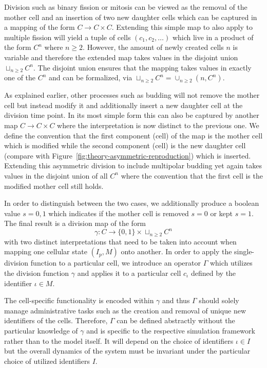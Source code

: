 Division such as binary fission or mitosis can be viewed as the removal of the mother
cell and an insertion of two new daughter cells which can be captured in a mapping of the form
$C\rightarrow C\times C$.
Extending this simple map to also apply to multiple fission will yield a tuple of cells
$(c_1,c_2,\dots)$ which live in a product of the form $C^n$ where $n\geq 2$.
However, the amount of newly created cells $n$ is variable and therefore the extended map takes
values in the disjoint union $\sqcup_{n\geq 2}C^n$.
The disjoint union ensures that the mapping takes values in exactly one of the $C^n$ and can be
formalized, via $\sqcup_{n\geq 2}C^n = \cup_{n\geq 2}(n,C^n)$.

As explained earlier, other processes such as budding will not remove the mother cell but instead
modify it and additionally insert a new daughter cell at the division time point.
In its most simple form this can also be captured by another map $C\rightarrow C\times C$ where
the interpretation is now distinct to the previous one.
We define the convention that the first component (cell) of the map is the mother cell which is
modified while the second component (cell) is the new daughter cell (compare with
Figure~\ref{fig:theory-asymmetric-reproduction}) which is inserted.
Extending this asymmetric division to include multipolar budding yet again takes values in the
disjoint union of all $C^n$ where the convention that the first cell is the modified mother cell
still holds.

In order to distinguish between the two cases, we additionally produce a boolean value $s=0,1$
which indicates if the mother cell is removed $s=0$ or kept $s=1$.
The final result is a division map of the form
\begin{equation}
    \gamma:C\rightarrow\{0,1\} \times \sqcup_{n\geq 2}C^n
\end{equation}
with two distinct interpretations that need to be taken into account when mapping one cellular
state $(I_p,M)$ onto another.
In order to apply the single-division function to a particular cell, we introduce an operator
$\Gamma$ which utilizes the division function $\gamma$ and applies it to a particular cell
$c_\iota$ defined by the identifier $\iota\in M$.

The cell-specific functionality is encoded within $\gamma$ and thus $\Gamma$ should solely
manage administrative tasks such as the creation and removal of unique new identifiers of the cells.
Therefore, $\Gamma$ can be defined abstractly without the particular knowledge of $\gamma$ and is
specific to the respective simulation framework rather than to the model itself.
It will depend on the choice of identifiers $\iota\in I$ but the overall dynamics of the system
must be invariant under the particular choice of utilized identifiers $I$.


